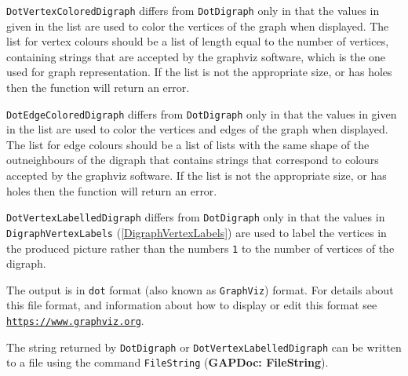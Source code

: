 \documentclass[a4paper,11pt]{report}
\begin{document}
{{{ \texttt{DotVertexColoredDigraph} differs from \texttt{DotDigraph} only in that the values in given in the list are used to color the vertices of
the graph when displayed. The list for vertex colours should be a list of
length equal to the number of vertices, containing strings that are accepted
by the graphviz software, which is the one used for graph representation. If
the list is not the appropriate size, or has holes then the function will
return an error.

 \texttt{DotEdgeColoredDigraph} differs from \texttt{DotDigraph} only in that the values in given in the list are used to color the vertices
and edges of the graph when displayed. The list for edge colours should be a
list of lists with the same shape of the outneighbours of the digraph that
contains strings that correspond to colours accepted by the graphviz software.
If the list is not the appropriate size, or has holes then the function will
return an error.

 \texttt{DotVertexLabelledDigraph} differs from \texttt{DotDigraph} only in that the values in \texttt{DigraphVertexLabels} (\ref{DigraphVertexLabels}) are used to label the vertices in the produced picture rather than the numbers \texttt{1} to the number of vertices of the digraph. 

 The output is in \texttt{dot} format (also known as \texttt{GraphViz}) format. For details about this file format, and information about how to
display or edit this format see \href{https://www.graphviz.org} {\texttt{https://www.graphviz.org}}. 

 The string returned by \texttt{DotDigraph} or \texttt{DotVertexLabelledDigraph} can be written to a file using the command \texttt{FileString} (\textbf{GAPDoc: FileString}).

}}}
\end{document}

